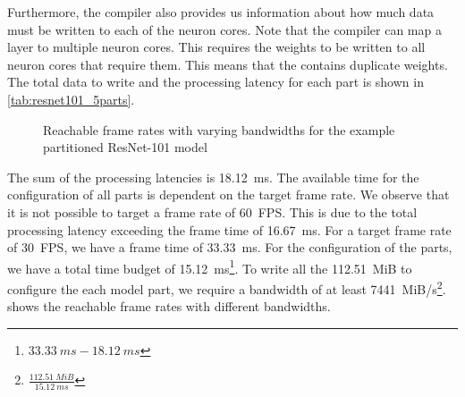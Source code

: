 Furthermore, the compiler also provides us information about how much data must be written to each of the neuron cores.
Note that the compiler can map a layer to multiple neuron cores.
This requires the weights to be written to all neuron cores that require them.
This means that the \graicore{} contains duplicate weights.
The total data to write and the processing latency for each part is shown in \cref{tab:resnet101_5parts}.

\begin{figure}[hbtp]
    \centering
    
    \caption{Reachable frame rates with varying bandwidths for the example partitioned ResNet-101 model}
    \label{fig:large_model_bandwidth_analysis_example_resnet101}
\end{figure}

The sum of the processing latencies is \SI{18.12}{ms}.
The available time for the configuration of all parts is dependent on the target frame rate.
We observe that it is not possible to target a frame rate of \SI{60}{FPS}.
This is due to the total processing latency exceeding the frame time of \SI{16.67}{ms}. 
For a target frame rate of \SI{30}{FPS}, we have a frame time of \SI{33.33}{ms}.
For the configuration of the parts, we have a total time budget of \SI{15.12}{ms}\footnote{$\SI{33.33}{ms} - \SI{18.12}{ms}$}.
To write all the \SI{112.51}{MiB} to configure the each model part, we require a bandwidth of at least \SI{7441}{MiB/s}\footnote{$\frac{\SI{112.51}{MiB}}{\SI{15.12}{ms}}$}.
 shows the reachable frame rates with different bandwidths.







